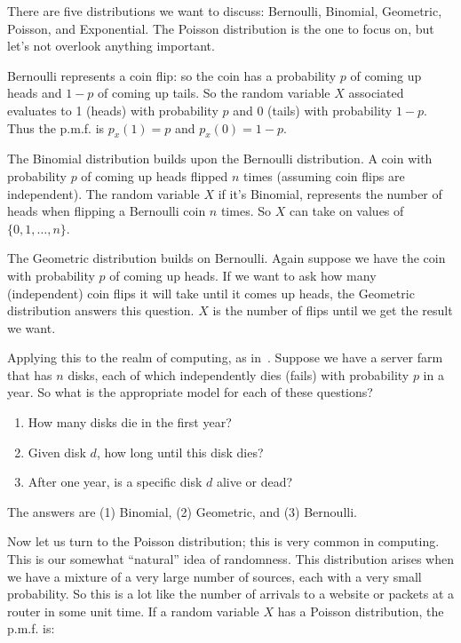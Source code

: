 There are five distributions we want to discuss: Bernoulli, Binomial, Geometric, Poisson, and Exponential. The Poisson distribution is the one to focus on, but let's not overlook anything important.

Bernoulli represents a coin flip: so the coin has a probability $p$ of coming up heads and $1-p$ of coming up tails. So the random variable $X$ associated evaluates to 1 (heads) with probability $p$ and 0 (tails) with probability $1-p$. Thus the p.m.f. is $p_{x}(1) = p$ and $p_{x}(0) = 1 - p$. 

The Binomial distribution builds upon the Bernoulli distribution. A coin with probability $p$ of coming up heads flipped $n$ times (assuming coin flips are independent). The random variable $X$ if it's Binomial, represents the number of heads when flipping a Bernoulli coin $n$ times. So $X$ can take on values of $\{0, 1, \ldots, n\}$. 

The Geometric distribution builds on Bernoulli. Again suppose we have the coin with probability $p$ of coming up heads. If we want to ask how many (independent) coin flips it will take until it comes up heads, the Geometric distribution answers this question. $X$ is the number of flips until we get the result we want.

Applying this to the realm of computing, as in~\cite{pmd}. Suppose we have a server farm that has $n$ disks, each of which independently dies (fails) with probability $p$ in a year. So what is the appropriate model for each of these questions?

\begin{enumerate}
	\item How many disks die in the first year?
	\item Given disk $d$, how long until this disk dies?
	\item After one year, is a specific disk $d$ alive or dead?
\end{enumerate}

The answers are (1) Binomial, (2) Geometric, and (3) Bernoulli.

Now let us turn to the Poisson distribution; this is very common in computing. This is our somewhat ``natural'' idea of randomness. This distribution arises when we have a mixture of a very large number of sources, each with a very small probability. So this is a lot like the number of arrivals to a website or packets at a router in some unit time. If a random variable $X$ has a Poisson distribution, the p.m.f. is:

